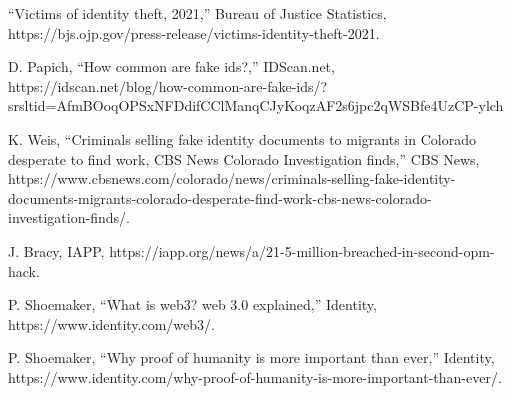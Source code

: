 \documentclass[conference]{IEEEtran}
\begin{document}
\begin{thebibliography}{00}
“Victims of identity theft, 2021,” Bureau of Justice Statistics, https://bjs.ojp.gov/press-release/victims-identity-theft-2021. 

D. Papich, “How common are fake ids?,” IDScan.net,
https://idscan.net/blog/how-common-are-fake-ids/?srsltid=AfmBOoqOPSxNFDdifCClManqCJyKoqzAF2s6jpc2qWSBfe4UzCP-ylch

K. Weis, “Criminals selling fake identity documents to migrants in Colorado desperate to find work, CBS News Colorado Investigation finds,” CBS News, https://www.cbsnews.com/colorado/news/criminals-selling-fake-identity-documents-migrants-colorado-desperate-find-work-cbs-news-colorado-investigation-finds/. 

J. Bracy, IAPP, https://iapp.org/news/a/21-5-million-breached-in-second-opm-hack. 

P. Shoemaker, “What is web3? web 3.0 explained,” Identity, https://www.identity.com/web3/.

P. Shoemaker, “Why proof of humanity is more important than ever,” Identity, https://www.identity.com/why-proof-of-humanity-is-more-important-than-ever/.

\end{thebibliography}
\end{document}
